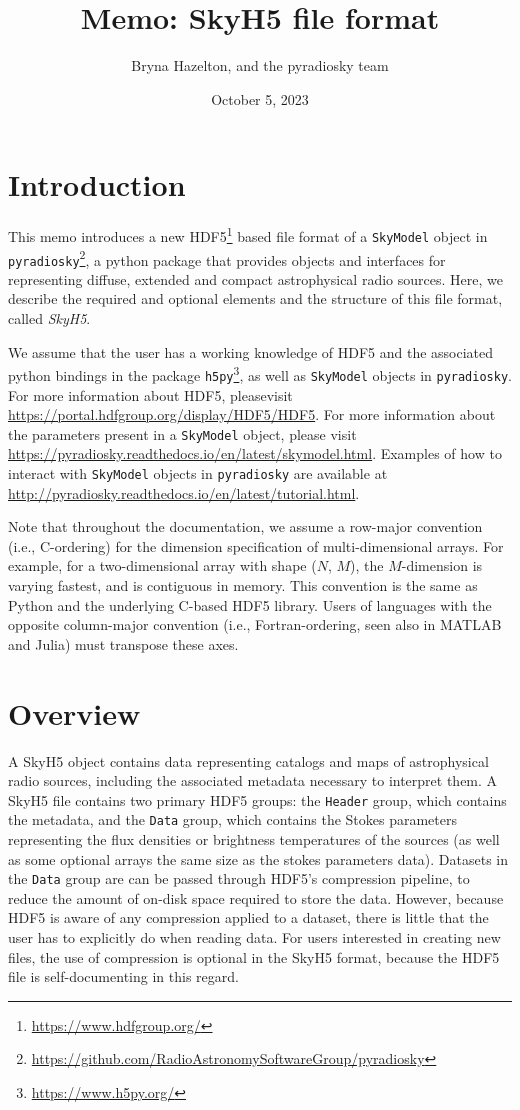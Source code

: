 \documentclass[11pt, oneside]{article}
\title{Memo: SkyH5 file format}
\author{Bryna Hazelton, and the pyradiosky team}
\date{October 5, 2023}
\begin{document}
\maketitle
\tableofcontents
\section{Introduction}
\label{sec:intro}

This memo introduces a new HDF5\footnote{\url{https://www.hdfgroup.org/}} based
file format of a \texttt{SkyModel} object in
\texttt{pyradiosky}\footnote{\url{https://github.com/RadioAstronomySoftwareGroup/pyradiosky}},
a python package that provides objects and interfaces for representing diffuse,
extended and compact astrophysical radio sources. Here, we describe the required
and optional elements and the structure of this file format, called \textit{SkyH5}.

We assume that the user has a working knowledge of HDF5 and the associated
python bindings in the package \texttt{h5py}\footnote{\url{https://www.h5py.org/}}, as
well as \texttt{SkyModel} objects in \texttt{pyradiosky}. For more information about
HDF5, pleasevisit \url{https://portal.hdfgroup.org/display/HDF5/HDF5}. For more
information about the parameters present in a \texttt{SkyModel} object, please visit
\url{https://pyradiosky.readthedocs.io/en/latest/skymodel.html}.
Examples of how to interact with \texttt{SkyModel} objects in \texttt{pyradiosky} are
available at \url{http://pyradiosky.readthedocs.io/en/latest/tutorial.html}.

Note that throughout the documentation, we assume a row-major convention (i.e.,
C-ordering) for the dimension specification of multi-dimensional arrays. For
example, for a two-dimensional array with shape ($N$, $M$), the $M$-dimension is
varying fastest, and is contiguous in memory. This convention is the same as
Python and the underlying C-based HDF5 library. Users of languages with the
opposite column-major convention (i.e., Fortran-ordering, seen also in MATLAB
and Julia) must transpose these axes.

\section{Overview}
\label{sec:overview}
A SkyH5 object contains data representing catalogs and maps of
astrophysical radio sources, including the associated metadata necessary to interpret
them. A SkyH5 file contains two primary HDF5 groups: the \texttt{Header} group,
which contains the metadata, and the \texttt{Data} group, which contains the Stokes
parameters representing the flux densities or brightness temperatures of the sources
(as well as some optional arrays the same size as the stokes parameters data).
Datasets in the \texttt{Data} group
are can be passed through HDF5's compression
pipeline, to reduce the amount of on-disk space required to store the data.
However, because HDF5 is aware of any compression applied to a dataset, there is
little that the user has to explicitly do when reading data. For users
interested in creating new files, the use of compression is optional in the
SkyH5 format, because the HDF5 file is self-documenting in this regard.
\end{document}
